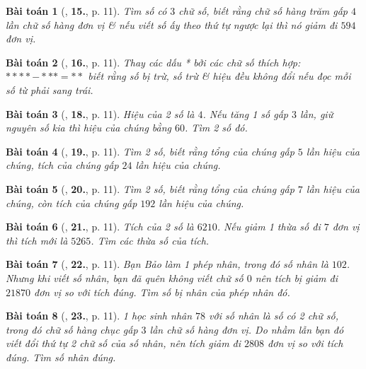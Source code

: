 \documentclass{article}
\numberwithin{equation}{section}
\newtheorem{baitoan}{Bài toán}[section]
\begin{document}
\begin{baitoan}[\cite{Binh_Toan_6_tap_1}, \textbf{15.}, p. 11]
	Tìm số có $3$ chữ số, biết rằng chữ số hàng trăm gấp $4$ lần chữ số hàng đơn vị \& nếu viết số ấy theo thứ tự ngược lại thì nó giảm đi $594$ đơn vị.
\end{baitoan}

\begin{baitoan}[\cite{Binh_Toan_6_tap_1}, \textbf{16.}, p. 11]
	Thay các dấu * bởi các chữ số thích hợp: $**** - *** = **$ biết rằng số bị trừ, số trừ \& hiệu đều không đổi nếu đọc mỗi số từ phải sang trái.
\end{baitoan}

\begin{baitoan}[\cite{Binh_Toan_6_tap_1}, \textbf{18.}, p. 11]
	Hiệu của 2 số là $4$. Nếu tăng 1 số gấp $3$ lần, giữ nguyên số kia thì hiệu của chúng bằng $60$. Tìm 2 số đó.
\end{baitoan}

\begin{baitoan}[\cite{Binh_Toan_6_tap_1}, \textbf{19.}, p. 11]
	Tìm 2 số, biết rằng tổng của chúng gấp $5$ lần hiệu của chúng, tích của chúng gấp $24$ lần hiệu của chúng.
\end{baitoan}

\begin{baitoan}[\cite{Binh_Toan_6_tap_1}, \textbf{20.}, p. 11]
	Tìm 2 số, biết rằng tổng của chúng gấp $7$ lần hiệu của chúng, còn tích của chúng gấp $192$ lần hiệu của chúng.
\end{baitoan}

\begin{baitoan}[\cite{Binh_Toan_6_tap_1}, \textbf{21.}, p. 11]
	Tích của 2 số là $6210$. Nếu giảm 1 thừa số đi $7$ đơn vị thì tích mới là $5265$. Tìm các thừa số của tích.
\end{baitoan}

\begin{baitoan}[\cite{Binh_Toan_6_tap_1}, \textbf{22.}, p. 11]
	Bạn Bảo làm 1 phép nhân, trong đó số nhân là $102$. Nhưng khi viết số nhân, bạn đã quên không viết chữ số $0$ nên tích bị giảm đi $21870$ đơn vị so với tích đúng. Tìm số bị nhân của phép nhân đó.
\end{baitoan}

\begin{baitoan}[\cite{Binh_Toan_6_tap_1}, \textbf{23.}, p. 11]
	1 học sinh nhân $78$ với số nhân là số có 2 chữ số, trong đó chữ số hàng chục gấp $3$ lần chữ số hàng đơn vị. Do nhầm lẫn bạn đó viết đổi thứ tự 2 chữ số của số nhân, nên tích giảm đi $2808$ đơn vị so với tích đúng. Tìm số nhân đúng.
\end{baitoan}
\end{document}
